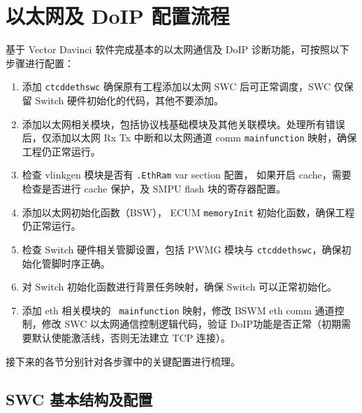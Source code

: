 \section{以太网及 DoIP 配置流程}

基于 Vector Davinci 软件完成基本的以太网通信及 DoIP 诊断功能，可按照以下步骤进行配置：

\begin{enumerate}
    \item 添加 \lstinline{ctcddethswc} 确保原有工程添加以太网 SWC 后可正常调度，SWC 仅保留 Switch 硬件初始化的代码，其他不要添加。
    \item 添加以太网相关模块，包括协议栈基础模块及其他关联模块。处理所有错误后，仅添加以太网 Rx Tx 中断和以太网通道 comm \lstinline{mainfunction} 映射，确保工程仍正常运行。
    \item 检查 vlinkgen 模块是否有 \lstinline{.EthRam} var section 配置， 如果开启 cache，需要检查是否进行 cache 保护，及 SMPU flash 块的寄存器配置。
    \item 添加以太网初始化函数（BSW）， ECUM \lstinline{memoryInit} 初始化函数，确保工程仍正常运行。
    \item 检查 Switch 硬件相关管脚设置，包括 PWMG 模块与 \lstinline{ctcddethswc}，确保初始化管脚时序正确。
    \item 对 Switch 初始化函数进行背景任务映射，确保 Switch 可以正常初始化。
    \item 添加 eth 相关模块的 \lstinline{ mainfunction} 映射，修改 BSWM eth comm 通道控制，修改 SWC 以太网通信控制逻辑代码，验证 DoIP功能是否正常（初期需要默认使能激活线，否则无法建立 TCP 连接）。
\end{enumerate} 

接下来的各节分别针对各步骤中的关键配置进行梳理。

\subsection{SWC 基本结构及配置}